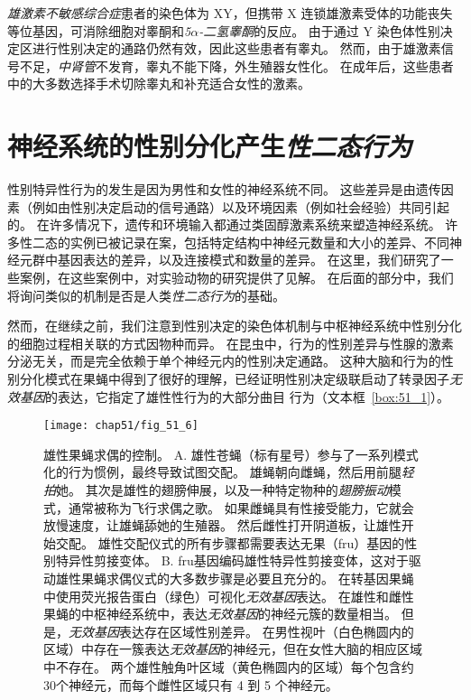 \textit{雄激素不敏感综合症}患者的染色体为 XY，但携带 X 连锁雄激素受体的功能丧失等位基因，可消除细胞对睾酮和\textit{5$\alpha$-二氢睾酮}的反应。
由于通过 Y 染色体性别决定区进行性别决定的通路仍然有效，因此这些患者有睾丸。
然而，由于雄激素信号不足，\textit{中肾管}不发育，睾丸不能下降，外生殖器女性化。
在成年后，这些患者中的大多数选择手术切除睾丸和补充适合女性的激素。



\section{神经系统的性别分化产生\textit{性二态行为}}

性别特异性行为的发生是因为男性和女性的神经系统不同。
这些差异是由遗传因素（例如由性别决定启动的信号通路）以及环境因素（例如社会经验）共同引起的。
在许多情况下，遗传和环境输入都通过类固醇激素系统来塑造神经系统。
许多性二态的实例已被记录在案，包括特定结构中神经元数量和大小的差异、不同神经元群中基因表达的差异，以及连接模式和数量的差异。
在这里，我们研究了一些案例，在这些案例中，对实验动物的研究提供了见解。
在后面的部分中，我们将询问类似的机制是否是人类\textit{性二态行为}的基础。


然而，在继续之前，我们注意到性别决定的染色体机制与中枢神经系统中性别分化的细胞过程相关联的方式因物种而异。
在昆虫中，行为的性别差异与性腺的激素分泌无关，而是完全依赖于单个神经元内的性别决定通路。
这种大脑和行为的性别分化模式在果蝇中得到了很好的理解，已经证明性别决定级联启动了转录因子\textit{无效基因}的表达，它指定了雄性性行为的大部分曲目 行为（文本框~\ref{box:51_1}）。


\begin{figure}[htbp]
	\centering
	\texttt{[image: chap51/fig\_51\_6]}
	\caption{雄性果蝇求偶的控制。
		A. 雄性苍蝇（标有星号）参与了一系列模式化的行为惯例，最终导致试图交配。
		雄蝇朝向雌蝇，然后用前腿\textit{轻拍}她。
		其次是雄性的翅膀伸展，以及一种特定物种的\textit{翅膀振动}模式，通常被称为飞行求偶之歌。
		如果雌蝇具有性接受能力，它就会放慢速度，让雄蝇舔她的生殖器。
		然后雌性打开阴道板，让雄性开始交配。
		雄性交配仪式的所有步骤都需要表达无果（fru）基因的性别特异性剪接变体\cite{greenspan2000courtship}。
		B. fru基因编码雄性特异性剪接变体，这对于驱动雄性果蝇求偶仪式的大多数步骤是必要且充分的。
		在转基因果蝇中使用荧光报告蛋白（绿色）可视化\textit{无效基因}表达。
		在雄性和雌性果蝇的中枢神经系统中，表达\textit{无效基因}的神经元簇的数量相当。
		但是，\textit{无效基因}表达存在区域性别差异。
		在男性视叶（白色椭圆内的区域）中存在一簇表达\textit{无效基因}的神经元，但在女性大脑的相应区域中不存在。
		两个雄性触角叶区域（黄色椭圆内的区域）每个包含约30个神经元，而每个雌性区域只有 4 到 5 个神经元\cite{kimura2005fruitless}。}
	\label{fig:51_6}
\end{figure}


